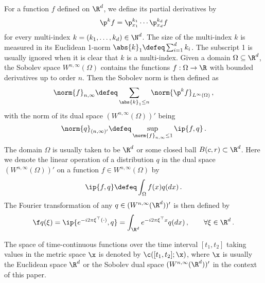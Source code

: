 \documentclass{amsart}
\begin{document}
For a function $f$ defined on $\R^d$, we define its partial derivatives by 
\begin{equation*}
    \p^k f = \p_{x_1}^{k_1} \cdots \p_{x_d}^{k_d} f
\end{equation*}
for every multi-index $k = (k_1, \dots, k_d) \in \N^d$.
The size of the multi-index $k$ is measured in its Euclidean 1-norm $\abs{k}_1 \defeq \sum_{i=1}^d k_i$.
The subscript 1 is usually ignored when it is clear that $k$ is a multi-index.
Given a domain $\Omega \subseteq \R^d$, the Sobolev space $W^{n,\infty}(\Omega)$ contains the functions $f: \Omega \to \R$ with bounded derivatives up to order $n$. 
Then the Sobolev norm is then defined as
\begin{equation*}
	\norm{f}_{n,\infty} \defeq \sum_{\abs{k}_1 \le n} \norm{\p^k f}_{L^\infty(\Omega)} \,,
\end{equation*}
with the norm of its dual space $(W^{n,\infty}(\Omega))'$ being
\begin{equation*}
	\norm{q}_{(n,\infty)'} \defeq \sup_{\norm{f}_{n,\infty} \le 1} \ip{f, q} \,.
\end{equation*}
The domain $\Omega$ is usually taken to be $\R^d$ or some closed ball $B(c,r) \subset \R^d$.
Here we denote the linear operation of a distribution $q$ in the dual space $(W^{n,\infty}(\Omega))'$ on a function $f \in W^{n,\infty}(\Omega)$ by 
\begin{equation*}
    \ip{f, q} \defeq \int_{\Omega} f(x) q(dx) \,.
\end{equation*}
The Fourier transformation of any $q \in (W^{n,\infty}(\R^d))'$ is then defined by 
\begin{equation*}
    \f q(\xi) = \ip{e^{-i2\pi \xi^\top (\cdot)}, q} = \int_{\R^d} e^{-i2\pi \xi^\top x} q(dx) \,, \qquad \forall \xi \in \R^d \,.
\end{equation*}

The space of time-continuous functions over the time interval $[t_1, t_2]$ taking values in the metric space $\x$ is denoted by $\c([t_1, t_2]; \x)$, where $\x$ is usually the Euclidean space $\R^d$ or the Sobolev dual space $(W^{n,\infty}(\R^d))'$ in the context of this paper. 
\end{document}
